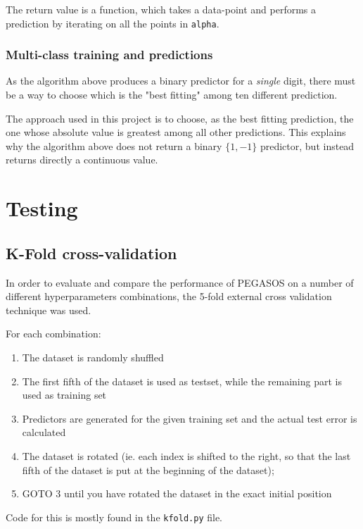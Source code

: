 \documentclass[a4paper]{article}
\begin{document}
The return value is a function, which takes a data-point and performs a prediction by iterating on all the points in \texttt{alpha}. 

\subsubsection{Multi-class training and predictions}
\label{sec:orgbc44a2f}

As the algorithm above produces a binary predictor for a \emph{single} digit, there must be a way to choose which is the "best fitting" among ten different prediction.

The approach used in this project is to choose, as the best fitting prediction, the one whose absolute value is greatest among all other predictions. This explains why the algorithm above does not return a binary \(\{1, -1\}\) predictor, but instead returns directly a continuous value.

\section{Testing}
\label{sec:org767086c}

\subsection{K-Fold cross-validation}
\label{sec:orgf6dc0e3}

In order to evaluate and compare the performance of PEGASOS on a number of different hyperparameters combinations, the 5-fold external cross validation technique was used.

For each combination:

\begin{enumerate}
\item The dataset is randomly shuffled
\item The first fifth of the dataset is used as testset, while the remaining part is used as training set
\item Predictors are generated for the given training set and the actual test error is calculated
\item The dataset is rotated (ie. each index is shifted to the right, so that the last fifth of the dataset is put at the beginning of the dataset);
\item GOTO 3 until you have rotated the dataset in the exact initial position
\end{enumerate}

Code for this is mostly found in the \texttt{kfold.py} file.
\end{document}
